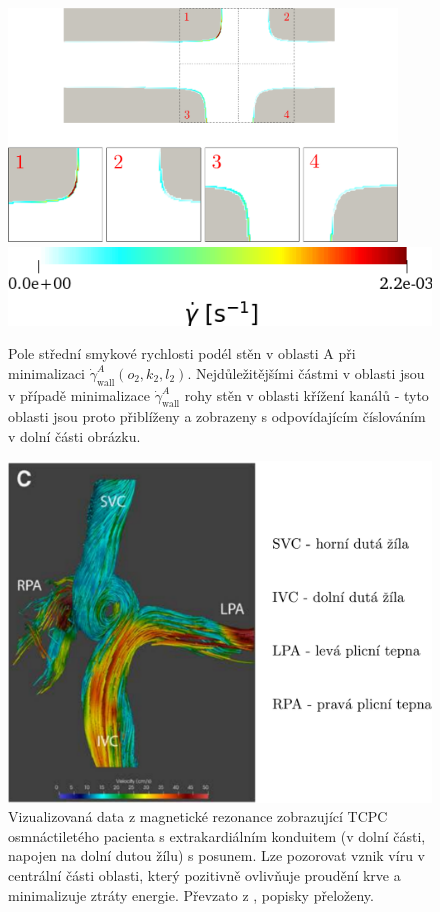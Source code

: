 \begin{figure}[H]
	\vspace{0mm}
	\centering
	\includegraphics[width=0.92\textwidth]{Images/tcpc/rohy/tcpc_dotgamma.pdf}\\[24pt]
	\includegraphics[width=0.55	\textwidth]{Images/tcpc/tcpc_dotgamma_dotgamma_ legenda.png}
	\caption{Pole střední smykové rychlosti podél stěn v oblasti A při minimalizaci $ \dot{\gamma} ^{A}_{\text{wall}}(o_2, k_2, l_2) $. Nejdůležitějšími částmi v oblasti jsou v případě minimalizace $ \dot{\gamma} ^{A}_{\text{wall}}$ rohy stěn v oblasti křížení kanálů - tyto oblasti jsou proto přiblíženy a zobrazeny s odpovídajícím číslováním v dolní části obrázku.}
	\label{fig:tcpc dotgamma shear rate}
\end{figure}
\newpage
\begin{figure}
	\centering
	\includegraphics[width=0.46	\textwidth]{Images/rijnbergtcpc.pdf}
	\vspace{2mm}
	\caption{Vizualizovaná data z magnetické rezonance zobrazující TCPC osmnáctiletého pacienta s extrakardiálním konduitem (v dolní části, napojen na dolní dutou žílu) s posunem. Lze pozorovat vznik víru v centrální části oblasti, který pozitivně ovlivňuje proudění krve a minimalizuje ztráty energie. Převzato z \cite{Rijnberg2018}, popisky přeloženy. }
	\label{fig:tcpc vir}
\end{figure}


